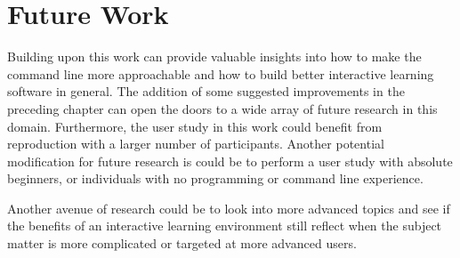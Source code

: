 \section{Future Work}
Building upon this work can provide valuable insights into how to make the
command line more approachable and how to build better interactive learning
software in general. The addition of some suggested improvements in the
preceding chapter can open the doors to a wide array of future research in
this domain. Furthermore, the user study in this work could benefit from 
reproduction with a larger number of participants. Another potential
modification for future research is could be to perform a user study with
absolute beginners, or individuals with no programming or command line
experience.

Another avenue of research could be to look into more advanced topics and see if
the benefits of an interactive learning environment still reflect when the
subject matter is more complicated or targeted at more advanced users.
